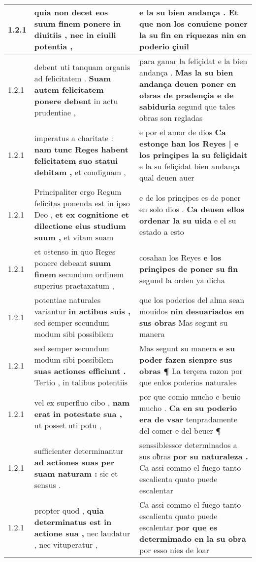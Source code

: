 \begin{tabular}{|p{1cm}|p{6.5cm}|p{6.5cm}|}
1.2.1 & quia non decet \textbf{ eos suum finem ponere in diuitiis , } nec in ciuili potentia , & e la su bien andança . \textbf{ Et que non los conuiene poner la su fin en riquezas } nin en poderio çiuil \\\hline
1.2.1 & debent uti tanquam organis ad felicitatem . \textbf{ Suam autem felicitatem ponere debent } in actu prudentiae , & para ganar la feliçidat e la bien andança . \textbf{ Mas la su bien andança deuen poner en obras de pradençia e de sabiduria } segund que tales obras son regladas \\\hline
1.2.1 & imperatus a charitate : \textbf{ nam tunc Reges habent felicitatem suo statui debitam , } et condignam , & e por el amor de dios \textbf{ Ca estonçe han los Reyes | e los prinçipes la su feliçidait } e la su feliçidat bien andança qual deuen auer \\\hline
1.2.1 & Principaliter ergo Regum felicitas ponenda est in ipso Deo , \textbf{ et ex cognitione et dilectione eius studium suum , } et vitam suam & e de los prinçipes es de poner en solo dios . \textbf{ Ca deuen ellos ordenar la su uida } e el su estado a esto \\\hline
1.2.1 & et ostenso in quo Reges ponere debeant \textbf{ suum finem } secundum ordinem superius praetaxatum , & cosahan los Reyes \textbf{ e los prinçipes de poner su fin } segund la orden ya dicha \\\hline
1.2.1 & potentiae naturales variantur \textbf{ in actibus suis , } sed semper secundum modum sibi possibilem & que los poderios del alma sean mouidos \textbf{ nin desuariados en sus obras } Mas segunt su manera \\\hline
1.2.1 & sed semper secundum modum sibi possibilem \textbf{ suas actiones efficiunt . } Tertio , in talibus potentiis & Mas segunt su manera \textbf{ e su poder fazen sienpre sus obras ¶ } La terçera razon por que enlos poderios naturales \\\hline
1.2.1 & vel ex superfluo cibo , \textbf{ nam erat in potestate sua , } ut posset uti potu , & por que comio mucho e beuio mucho . \textbf{ Ca en su poderio era de vsar } tenpradamente del comer e del beuer ¶ \\\hline
1.2.1 & sufficienter determinantur \textbf{ ad actiones suas per suam naturam : } sic et sensus . & senssiblessor determinados a sus oƀras \textbf{ por su naturaleza . } Ca assi commo el fuego tanto escalienta quato puede escalentar \\\hline
1.2.1 & propter quod , \textbf{ quia determinatus est in actione sua , } nec laudatur , nec vituperatur , & Ca assi commo el fuego tanto escalienta quato puede escalentar \textbf{ por que es determimado en la su obra } por esso nies de loar \\\hline

\end{tabular}
